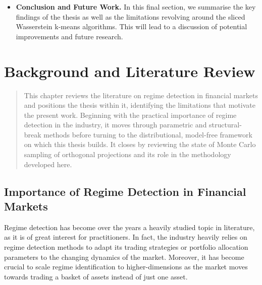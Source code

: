 \documentclass[12pt,a4paper]{report}
\begin{document}
\begin{itemize}
  \item \textbf{Conclusion and Future Work.}
  In this final section, we summarise the key findings of the thesis as well as the limitations revolving around the sliced Wasserstein k-means algorithms. 
   This will lead to a discussion of potential improvements and future research. 

\end{itemize}


\chapter{Background and Literature Review}

\begin{quote}
This chapter reviews the literature on regime detection in financial markets and
positions the thesis within it, identifying the limitations that motivate the
present work. Beginning with the practical importance of regime detection in the
industry, it moves through parametric and structural-break methods before turning
to the distributional, model-free framework on which this thesis builds. It closes
by reviewing the state of Monte Carlo sampling of orthogonal projections and its
role in the methodology developed here.
\end{quote}


\section{Importance of Regime Detection in Financial Markets}
Regime detection has become over the years a heavily studied topic in literature, as it is of great interest for practitioners. 
In fact, the industry heavily relies on regime detection methods to adapt its trading strategies or portfolio allocation parameters to the changing dynamics of the market.
Moreover, it has become crucial to scale regime identification to higher-dimensions as the market moves towards trading a basket of assets instead of just one asset. 
\end{document}
